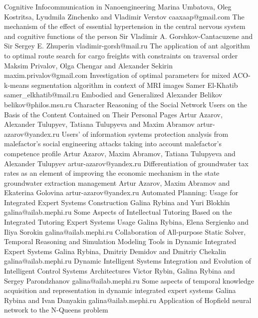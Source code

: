 \documentclass[10pt,fleqn,openany]{book} %
\begin{document}
\begin{enumerate}
	\poster
		{Cognitive Infocommunication in Nanoengineering}
		{Marina Umbatova, Oleg Kostritsa, Lyudmila Zinchenko and Vladimir Verstov}
		{caaxaap@gmail.com}
	\poster
		{The mechanism of the effect of essential hypertension in the central nervous system and cognitive functions of the person}
		{Sir Vladimir A. Gorshkov-Cantacuzene and Sir Sergey E. Zhuperin}	
		{vladimir-gorsh@mail.ru}
	\poster
		{The application of ant algorithm to optimal route search for cargo freights with constraints on traversal order}
		{Maksim Privalov, Olga Chengar and Alexander Sekirin}
		{maxim.privalov@gmail.com}
	\poster
		{Investigation of optimal parameters for mixed ACO-k-means segmentation algorithm in context of MRI images}
		{Samer El-Khatib}
		{samer\_elkhatib@mail.ru}
	\poster
		{Embodied and Generalized}
		{Alexander Belikov}
		{belikov@philos.msu.ru}
	\poster
		{Character Reasoning of the Social Network Users on the Basis of the Content Contained on Their Personal Pages}
		{Artur Azarov, Alexander Tulupyev, Tatiana Tulupyeva and Maxim Abramov}
		{artur-azarov@yandex.ru}
	\poster
		{Users’ of information systems protection analysis from malefactor’s social engineering attacks taking into account malefactor’s competence profile}
		{Artur Azarov, Maxim Abramov, Tatiana Tulupyeva and Alexander Tulupyev}
		{artur-azarov@yandex.ru}
	\poster
		{Differentiation of groundwater tax rates as an element of improving the economic mechanism in the state groundwater extraction management}
		{Artur Azarov, Maxim Abramov and Ekaterina Golovina}
		{artur-azarov@yandex.ru}
	\poster
		{Automated Planning: Usage for Integrated Expert Systems Construction}
		{Galina Rybina and Yuri Blokhin}
		{galina@ailab.mephi.ru}
	\poster
		{Some Aspects of Intellectual Tutoring Based on the Integrated Tutoring Expert Systems Usage}
		{Galina Rybina, Elena Sergienko and Iliya Sorokin}
		{galina@ailab.mephi.ru}
	\poster
		{Collaboration of All-purpose Static Solver, Temporal Reasoning and Simulation Modeling Tools in Dynamic Integrated Expert Systems}
		{Galina Rybina, Dmitriy Demidov and Dmitriy Chekalin}
		{galina@ailab.mephi.ru}
	\poster
		{Dynamic Intelligent Systems Integration and Evolution of Intelligent Control Systems Architectures}
		{Victor Rybin, Galina Rybina and Sergey Parondzhanov}
		{galina@ailab.mephi.ru}
	\poster
		{Some aspects of temporal knowledge acquisition and representation in dynamic integrated expert systems}
		{Galina Rybina and Ivan Danyakin}
		{galina@ailab.mephi.ru}
	\poster
		{Application of Hopfield neural network to the N-Queens problem}

\end{enumerate}
\end{document}
